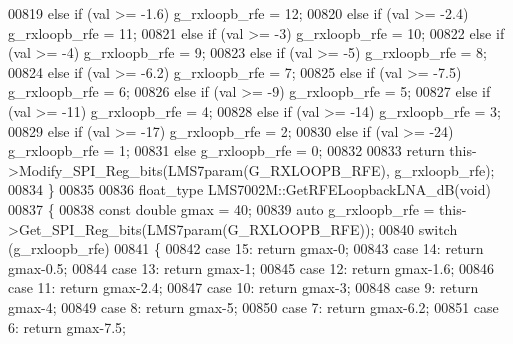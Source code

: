 \begin{DoxyCode}
{{{{{{{{{{{{{{{{{{{{{{{{{00819     \textcolor{keywordflow}{else} \textcolor{keywordflow}{if} (val >= -1.6) g\_rxloopb\_rfe = 12;
00820     \textcolor{keywordflow}{else} \textcolor{keywordflow}{if} (val >= -2.4) g\_rxloopb\_rfe = 11;
00821     \textcolor{keywordflow}{else} \textcolor{keywordflow}{if} (val >= -3) g\_rxloopb\_rfe = 10;
00822     \textcolor{keywordflow}{else} \textcolor{keywordflow}{if} (val >= -4) g\_rxloopb\_rfe = 9;
00823     \textcolor{keywordflow}{else} \textcolor{keywordflow}{if} (val >= -5) g\_rxloopb\_rfe = 8;
00824     \textcolor{keywordflow}{else} \textcolor{keywordflow}{if} (val >= -6.2) g\_rxloopb\_rfe = 7;
00825     \textcolor{keywordflow}{else} \textcolor{keywordflow}{if} (val >= -7.5) g\_rxloopb\_rfe = 6;
00826     \textcolor{keywordflow}{else} \textcolor{keywordflow}{if} (val >= -9) g\_rxloopb\_rfe = 5;
00827     \textcolor{keywordflow}{else} \textcolor{keywordflow}{if} (val >= -11) g\_rxloopb\_rfe = 4;
00828     \textcolor{keywordflow}{else} \textcolor{keywordflow}{if} (val >= -14) g\_rxloopb\_rfe = 3;
00829     \textcolor{keywordflow}{else} \textcolor{keywordflow}{if} (val >= -17) g\_rxloopb\_rfe = 2;
00830     \textcolor{keywordflow}{else} \textcolor{keywordflow}{if} (val >= -24) g\_rxloopb\_rfe = 1;
00831     \textcolor{keywordflow}{else} g\_rxloopb\_rfe = 0;
00832 
00833     \textcolor{keywordflow}{return} this->Modify_SPI_Reg_bits(LMS7param(G_RXLOOPB_RFE), g\_rxloopb\_rfe);
00834 \}
00835 
00836 float_type LMS7002M::GetRFELoopbackLNA_dB(\textcolor{keywordtype}{void})
00837 \{
00838     \textcolor{keyword}{const} \textcolor{keywordtype}{double} gmax = 40;
00839     \textcolor{keyword}{auto} g\_rxloopb\_rfe = this->Get_SPI_Reg_bits(LMS7param(G_RXLOOPB_RFE));
00840     \textcolor{keywordflow}{switch} (g\_rxloopb\_rfe)
00841     \{
00842     \textcolor{keywordflow}{case} 15: \textcolor{keywordflow}{return} gmax-0;
00843     \textcolor{keywordflow}{case} 14: \textcolor{keywordflow}{return} gmax-0.5;
00844     \textcolor{keywordflow}{case} 13: \textcolor{keywordflow}{return} gmax-1;
00845     \textcolor{keywordflow}{case} 12: \textcolor{keywordflow}{return} gmax-1.6;
00846     \textcolor{keywordflow}{case} 11: \textcolor{keywordflow}{return} gmax-2.4;
00847     \textcolor{keywordflow}{case} 10: \textcolor{keywordflow}{return} gmax-3;
00848     \textcolor{keywordflow}{case} 9: \textcolor{keywordflow}{return} gmax-4;
00849     \textcolor{keywordflow}{case} 8: \textcolor{keywordflow}{return} gmax-5;
00850     \textcolor{keywordflow}{case} 7: \textcolor{keywordflow}{return} gmax-6.2;
00851     \textcolor{keywordflow}{case} 6: \textcolor{keywordflow}{return} gmax-7.5;
}}}}}}}}}}}}}}}}}}}}}}}}}
\end{DoxyCode}
